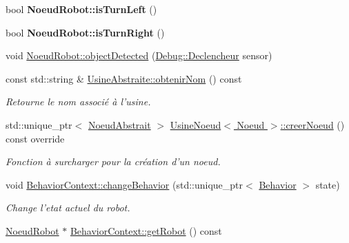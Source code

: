\begin{DoxyCompactItemize}
\item 
\hypertarget{group__inf2990_ga49f65d4d32c9abd0da2576c07bae97e4}{bool {\bfseries Noeud\-Robot\-::is\-Turn\-Left} ()}\label{group__inf2990_ga49f65d4d32c9abd0da2576c07bae97e4}

\item 
\hypertarget{group__inf2990_ga2a9dbfd2c32f254b20c81ae3f006be31}{bool {\bfseries Noeud\-Robot\-::is\-Turn\-Right} ()}\label{group__inf2990_ga2a9dbfd2c32f254b20c81ae3f006be31}

\item 
void \hyperlink{group__inf2990_ga3fdf900e74c2634f92abcb164f6ac96a}{Noeud\-Robot\-::object\-Detected} (\hyperlink{class_debug_afd6ed3c50c08d0a7830cd5253b4ab8b6}{Debug\-::\-Declencheur} sensor)
\item 
\hypertarget{group__inf2990_gad39877ea31a37efc3e58708193155c3c}{const std\-::string \& \hyperlink{group__inf2990_gad39877ea31a37efc3e58708193155c3c}{Usine\-Abstraite\-::obtenir\-Nom} () const }\label{group__inf2990_gad39877ea31a37efc3e58708193155c3c}

\begin{DoxyCompactList}\small\item\em Retourne le nom associé à l'usine. \end{DoxyCompactList}\item 
std\-::unique\-\_\-ptr$<$ \hyperlink{class_noeud_abstrait}{Noeud\-Abstrait} $>$ \hyperlink{group__inf2990_gaefabfaab4efcf2d2e910cff0246d4735}{Usine\-Noeud$<$ Noeud $>$\-::creer\-Noeud} () const override
\begin{DoxyCompactList}\small\item\em Fonction à surcharger pour la création d'un noeud. \end{DoxyCompactList}\item 
\hypertarget{group__inf2990_gab48b5ca95ff1064b51a159e41e68fbaf}{void \hyperlink{group__inf2990_gab48b5ca95ff1064b51a159e41e68fbaf}{Behavior\-Context\-::change\-Behavior} (std\-::unique\-\_\-ptr$<$ \hyperlink{class_behavior}{Behavior} $>$ state)}\label{group__inf2990_gab48b5ca95ff1064b51a159e41e68fbaf}

\begin{DoxyCompactList}\small\item\em Change l'etat actuel du robot. \end{DoxyCompactList}\item 
\hypertarget{group__inf2990_gab248d4182058e0746819e567d9fecbfb}{\hyperlink{class_noeud_robot}{Noeud\-Robot} $\ast$ \hyperlink{group__inf2990_gab248d4182058e0746819e567d9fecbfb}{Behavior\-Context\-::get\-Robot} () const }\label{group__inf2990_gab248d4182058e0746819e567d9fecbfb}


\end{DoxyCompactItemize}
